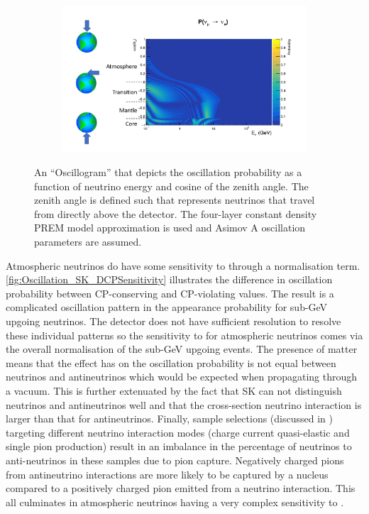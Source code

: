 \begin{figure}[h]
  \begin{subfigure}[t]{0.8\textwidth}
    \includegraphics[width=\textwidth, trim={0mm 0mm 0mm 0mm}, clip,page=1]{Figures/Oscillation/BasicOscillogramWithNotes.pdf}
  \end{subfigure}
  \caption{An ``Oscillogram'' that depicts the  oscillation probability as a function of neutrino energy and cosine of the zenith angle. The zenith angle is defined such that  represents neutrinos that travel from directly above the detector. The four-layer constant density PREM model approximation is used and Asimov A oscillation parameters are assumed.}
  \label{fig:Oscillation_SK_BasicOscillogram}
\end{figure}

Atmospheric neutrinos do have some sensitivity to \dcp through a normalisation term. \autoref{fig:Oscillation_SK_DCPSensitivity} illustrates the difference in oscillation probability between CP-conserving and CP-violating \dcp values. The result is a complicated oscillation pattern in the appearance probability for sub-GeV upgoing neutrinos. The detector does not have sufficient resolution to resolve these individual patterns so the sensitivity to \dcp for atmospheric neutrinos comes via the overall normalisation of the sub-GeV upgoing events. The presence of matter means that the effect \dcp has on the oscillation probability is not equal between neutrinos and antineutrinos which would be expected when propagating through a vacuum. This is further extenuated by the fact that SK can not distinguish neutrinos and antineutrinos well and that the cross-section neutrino interaction is larger than that for antineutrinos. Finally, sample selections (discussed in ) targeting different neutrino interaction modes (charge current quasi-elastic and single pion production) result in an imbalance in the percentage of neutrinos to anti-neutrinos in these samples due to pion capture. Negatively charged pions from antineutrino interactions are more likely to be captured by a nucleus compared to a positively charged pion emitted from a neutrino interaction. This all culminates in atmospheric neutrinos having a very complex sensitivity to \dcp.

